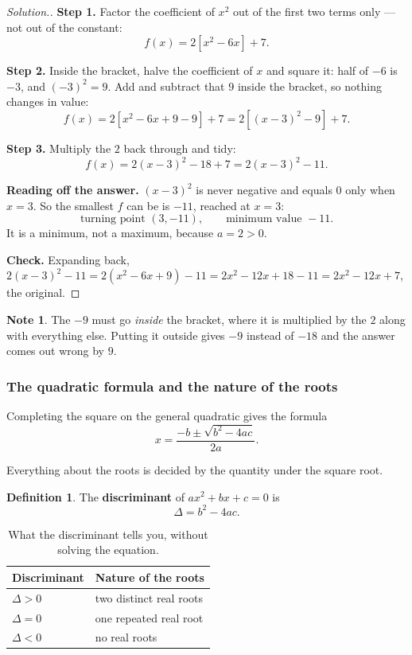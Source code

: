 \documentclass[11pt,a4paper]{article}
\theoremstyle{definition}
\newtheorem{definition}[thm]{Definition}
\newtheorem{note}[thm]{Note}
\newenvironment{solution}
  {\renewcommand{\qedsymbol}{}\begin{proof}[\textit{Solution}.]}
  {\end{proof}}
\begin{document}
\begin{solution}
\textbf{Step 1.} Factor the coefficient of $x^2$ out of the first two terms only ---
not out of the constant:
$$f(x)=2\left[x^2-6x\right]+7.$$

\textbf{Step 2.} Inside the bracket, halve the coefficient of $x$ and square it:
half of $-6$ is $-3$, and $(-3)^2=9$. Add and subtract that $9$ inside the bracket, so
nothing changes in value:
$$f(x)=2\left[x^2-6x+9-9\right]+7=2\left[(x-3)^2-9\right]+7.$$

\textbf{Step 3.} Multiply the $2$ back through and tidy:
$$f(x)=2(x-3)^2-18+7=2(x-3)^2-11.$$

\textbf{Reading off the answer.} $(x-3)^2$ is never negative and equals $0$ only when
$x=3$. So the smallest $f$ can be is $-11$, reached at $x=3$:
$$\text{turning point } (3,-11),\qquad \text{minimum value } -11.$$
It is a minimum, not a maximum, because $a=2>0$.

\textbf{Check.} Expanding back, $2(x-3)^2-11=2(x^2-6x+9)-11=2x^2-12x+18-11
=2x^2-12x+7$, the original.
\end{solution}

\begin{note}
The $-9$ must go \emph{inside} the bracket, where it is multiplied by the $2$ along
with everything else. Putting it outside gives $-9$ instead of $-18$ and the answer
comes out wrong by $9$.
\end{note}

\subsubsection{The quadratic formula and the nature of the roots}

Completing the square on the general quadratic gives the formula
$$x=\frac{-b\pm\sqrt{b^2-4ac}}{2a}.$$

Everything about the roots is decided by the quantity under the square root.

\begin{definition}
The \textbf{discriminant} of $ax^2+bx+c=0$ is
$$\Delta=b^2-4ac.$$
\end{definition}

\begin{table}[H]
\centering
\begin{tabular}{|l|l|}
\hline
Discriminant & Nature of the roots\\
\hline
$\Delta>0$ & two distinct real roots\\
$\Delta=0$ & one repeated real root\\
$\Delta<0$ & no real roots\\
\hline
\end{tabular}
\caption{What the discriminant tells you, without solving the equation.}
\end{table}
\end{document}
